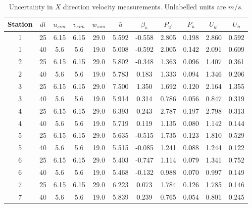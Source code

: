 \renewcommand\baselinestretch{1.3}\selectfont
\begin{table}[H]
\begin{center}
\begin{tabular}{|ccccccccccc|}
	\hline
	Station & $dt$ & $u_{sim}$ & $v_{sim}$ & $w_{sim}$ & $\bar{u}$ & $\beta_u$ & $P_{u^{\prime}}$ & $P_{\bar{u}}$ & $U_{u^{\prime}}$ & $U_{\bar{u}}$\\
	\hline
	1 & 25 & 6.15 & 6.15 & 29.0 & 5.592 & -0.558 & 2.805 & 0.198 & 2.860 & 0.592\\
	1 & 40 & 5.6 & 5.6 & 19.0 & 5.008 & -0.592 & 2.005 & 0.142 & 2.091 & 0.609\\
	2 & 25 & 6.15 & 6.15 & 29.0 & 5.802 & -0.348 & 1.363 & 0.096 & 1.407 & 0.361\\
	2 & 40 & 5.6 & 5.6 & 19.0 & 5.783 & 0.183 & 1.333 & 0.094 & 1.346 & 0.206\\
	3 & 25 & 6.15 & 6.15 & 29.0 & 7.500 & 1.350 & 1.692 & 0.120 & 2.164 & 1.355\\
	3 & 40 & 5.6 & 5.6 & 19.0 & 5.914 & 0.314 & 0.786 & 0.056 & 0.847 & 0.319\\
	4 & 25 & 6.15 & 6.15 & 29.0 & 6.393 & 0.243 & 2.787 & 0.197 & 2.798 & 0.313\\
	4 & 40 & 5.6 & 5.6 & 19.0 & 5.719 & 0.119 & 1.135 & 0.080 & 1.142 & 0.144\\
	5 & 25 & 6.15 & 6.15 & 29.0 & 5.635 & -0.515 & 1.735 & 0.123 & 1.810 & 0.529\\
	5 & 40 & 5.6 & 5.6 & 19.0 & 5.515 & -0.085 & 1.241 & 0.088 & 1.244 & 0.122\\
	6 & 25 & 6.15 & 6.15 & 29.0 & 5.403 & -0.747 & 1.114 & 0.079 & 1.341 & 0.752\\
	6 & 40 & 5.6 & 5.6 & 19.0 & 5.468 & -0.132 & 0.988 & 0.070 & 0.997 & 0.149\\
	7 & 25 & 6.15 & 6.15 & 29.0 & 6.223 & 0.073 & 1.784 & 0.126 & 1.785 & 0.146\\
	7 & 40 & 5.6 & 5.6 & 19.0 & 5.839 & 0.239 & 0.765 & 0.054 & 0.801 & 0.245\\
	\hline
\end{tabular}
\caption{Uncertainty in $X$ direction velocity measurements. Unlabelled units are $m/s$.}
\label{table:uncertainties_u}
\end{center}
\end{table}
\renewcommand\baselinestretch{2}\selectfont
